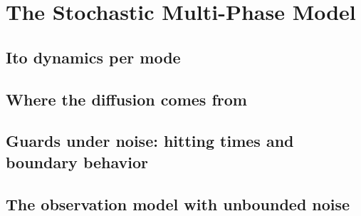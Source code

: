 
\section{The Stochastic Multi-Phase Model}
\label{p3:sec:model}

\subsection{Ito dynamics per mode}
\label{p3:sub:ito_dynamics_per_mode}

\subsection{Where the diffusion comes from}
\label{p3:sub:where_diffusion_comes_from}

\subsection{Guards under noise: hitting times and boundary behavior}
\label{p3:sub:guards_under_noise}

\subsection{The observation model with unbounded noise}
\label{p3:sub:observation_model}
